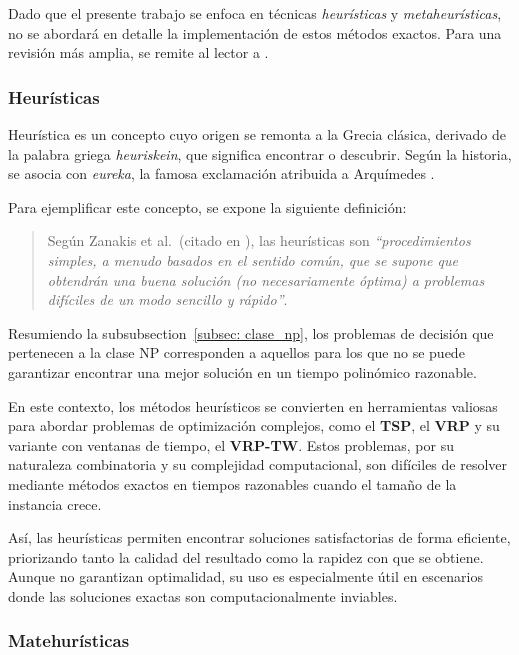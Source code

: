 \documentclass[12pt,titlepage,twoside,openright]{book}
\begin{document}
Dado que el presente trabajo se enfoca en técnicas \emph{heurísticas} y \emph{metaheurísticas}, no se abordará en detalle la implementación de estos métodos exactos. Para una revisión más amplia, se remite al lector a \citep{montes2017}.

\subsubsection{Heurísticas}

Heurística es un concepto cuyo origen se remonta a la Grecia clásica, derivado de la palabra griega \textit{heuriskein}, que significa encontrar o descubrir. Según la historia, se asocia con \textit{eureka}, la famosa exclamación atribuida a Arquímedes \citep{antonioSuarez2014}.

Para ejemplificar este concepto, se expone la siguiente definición:

\begin{quote}
	Según Zanakis et al.\ (citado en \citep{duarte2007metaheuristicas}), las heurísticas son \textit{``procedimientos simples, a menudo basados en el sentido común, que se supone que obtendrán una buena solución (no necesariamente óptima) a problemas difíciles de un modo sencillo y rápido''}.
\end{quote}



Resumiendo la subsubsection~\ref{subsec: clase_np}, los problemas de decisión que pertenecen a la clase NP corresponden a aquellos para los que no se puede garantizar encontrar una mejor solución en un tiempo polinómico razonable.

En este contexto, los métodos heurísticos se convierten en herramientas valiosas para abordar problemas de optimización complejos, como el \textbf{TSP}, el \textbf{VRP} y su variante con ventanas de tiempo, el \textbf{VRP-TW}. Estos problemas, por su naturaleza combinatoria y su complejidad computacional, son difíciles de resolver mediante métodos exactos en tiempos razonables cuando el tamaño de la instancia crece.

Así, las heurísticas permiten encontrar soluciones satisfactorias de forma eficiente, priorizando tanto la calidad del resultado como la rapidez con que se obtiene. Aunque no garantizan optimalidad, su uso es especialmente útil en escenarios donde las soluciones exactas son computacionalmente inviables.


\subsubsection{Matehurísticas}
\end{document}
